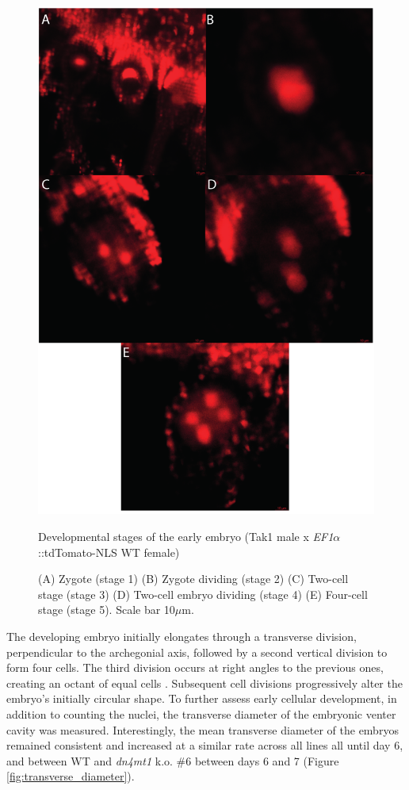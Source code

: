 \begin{figure}[htbp!] 
\centering    
    \includegraphics[width=1\textwidth]{Chapter3/Figs/Figure10_Developmental_stages.pdf}
\caption{Developmental stages of the early embryo (Tak1 male x \textit{EF1$\alpha$}::tdTomato-NLS WT female)}
\label{fig:dev_stages}
\captionsetup{font=small}
    \caption*{(A) Zygote (stage 1) (B) Zygote dividing (stage 2) (C) Two-cell stage (stage 3) (D) Two-cell embryo dividing (stage 4) (E) Four-cell stage (stage 5). Scale bar 10$\mu$m.}
\end{figure}

The developing embryo initially elongates through a transverse division, perpendicular to the archegonial axis, followed by a second vertical division to form four cells. The third division occurs at right angles to the previous ones, creating an octant of equal cells \cite{RN143,RN144}. Subsequent cell divisions progressively alter the embryo's initially circular shape. To further assess early cellular development, in addition to counting the nuclei, the transverse diameter of the embryonic venter cavity was measured. Interestingly, the mean transverse diameter of the embryos remained consistent and increased at a similar rate across all lines all until day 6, and between WT and \textit{dn4mt1} k.o. \#6 between days 6 and 7 (Figure \ref{fig:transverse_diameter}).

